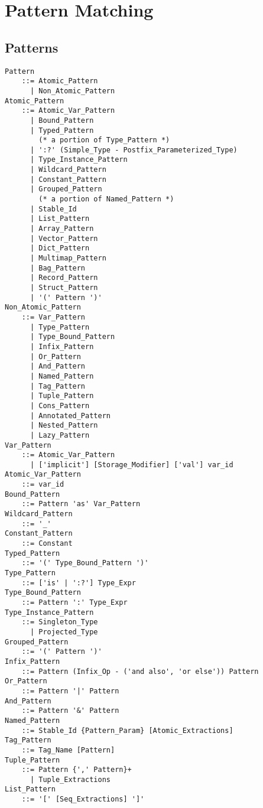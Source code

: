 
\chapter{Pattern Matching}
\label{sec:pattern-matching}

\minitoc

\newpage




\section{Patterns}
\label{sec:patterns}

\grammar\begin{lstlisting}
Pattern
    ::= Atomic_Pattern
      | Non_Atomic_Pattern
Atomic_Pattern 
    ::= Atomic_Var_Pattern
      | Bound_Pattern
      | Typed_Pattern
        (* a portion of Type_Pattern *)
      | ':?' (Simple_Type - Postfix_Parameterized_Type)  
      | Type_Instance_Pattern
      | Wildcard_Pattern
      | Constant_Pattern
      | Grouped_Pattern
        (* a portion of Named_Pattern *)
      | Stable_Id  
      | List_Pattern
      | Array_Pattern
      | Vector_Pattern
      | Dict_Pattern
      | Multimap_Pattern
      | Bag_Pattern
      | Record_Pattern
      | Struct_Pattern
      | '(' Pattern ')'
Non_Atomic_Pattern 
    ::= Var_Pattern
      | Type_Pattern
      | Type_Bound_Pattern
      | Infix_Pattern
      | Or_Pattern
      | And_Pattern
      | Named_Pattern
      | Tag_Pattern
      | Tuple_Pattern
      | Cons_Pattern
      | Annotated_Pattern
      | Nested_Pattern
      | Lazy_Pattern
Var_Pattern 
    ::= Atomic_Var_Pattern
      | ['implicit'] [Storage_Modifier] ['val'] var_id
Atomic_Var_Pattern 
    ::= var_id
Bound_Pattern 
    ::= Pattern 'as' Var_Pattern
Wildcard_Pattern 
    ::= '_'
Constant_Pattern 
    ::= Constant
Typed_Pattern 
    ::= '(' Type_Bound_Pattern ')'
Type_Pattern 
    ::= ['is' | ':?'] Type_Expr
Type_Bound_Pattern 
    ::= Pattern ':' Type_Expr
Type_Instance_Pattern 
    ::= Singleton_Type
      | Projected_Type
Grouped_Pattern 
    ::= '(' Pattern ')'
Infix_Pattern 
    ::= Pattern (Infix_Op - ('and also', 'or else')) Pattern
Or_Pattern 
    ::= Pattern '|' Pattern
And_Pattern 
    ::= Pattern '&' Pattern
Named_Pattern 
    ::= Stable_Id {Pattern_Param} [Atomic_Extractions]
Tag_Pattern
    ::= Tag_Name [Pattern]
Tuple_Pattern 
    ::= Pattern {',' Pattern}+
      | Tuple_Extractions
List_Pattern
    ::= '[' [Seq_Extractions] ']'

\end{lstlisting}
